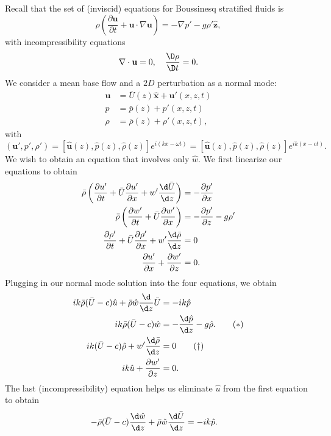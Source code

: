 \documentclass[a4paper]{article}
\begin{document}
Recall that the set of (inviscid) equations for Boussinesq stratified fluids is
\[
  \rho \left(\frac{\partial \mathbf{u}}{\partial t} + \mathbf{u} \cdot \nabla \mathbf{u}\right) = - \nabla p' - g \rho' \hat{\mathbf{z}},
\]
with incompressibility equations
\[
  \nabla \cdot \mathbf{u} = 0,\quad \frac{\D \rho}{\D t} = 0.
\]
We consider a mean base flow and a $2D$ perturbation as a normal mode:
\begin{align*}
  \mathbf{u} &= \bar{U}(z) \hat{\mathbf{x}} + \mathbf{u}'(x, z, t)\\
  p &= \bar{p}(z) + p'(x, z, t)\\
  \rho &= \bar{\rho}(z) + \rho'(x, z, t),
\end{align*}
with
\[
  (\mathbf{u}', p', \rho') = [\hat{\mathbf{u}}(z), \hat{p}(z), \hat{\rho}(z)] e^{i(kx - \omega t)} = [\hat{\mathbf{u}}(z), \hat{p}(z), \hat{\rho}(z)] e^{ik(x - ct)}.
\]
We wish to obtain an equation that involves only $\hat{w}$. We first linearize our equations to obtain
\begin{align*}
  \bar{\rho} \left(\frac{\partial u'}{\partial t} + \bar{U} \frac{\partial u'}{\partial x} + w' \frac{\d \bar{U}}{\d z}\right) &= - \frac{\partial p'}{\partial x}\\
  \bar{\rho} \left(\frac{\partial w'}{\partial t} + \bar{U} \frac{\partial w'}{\partial x} \right) &= - \frac{\partial p'}{\partial z} - g \rho'\\
  \frac{\partial \rho'}{\partial t} + \bar{U} \frac{\partial \rho'}{\partial x} + w' \frac{\d \bar{\rho}}{\d z} &= 0\\
  \frac{\partial u'}{\partial x} + \frac{\partial w'}{\partial z} &= 0.
\end{align*}
Plugging in our normal mode solution into the four equations, we obtain
\begin{align*}
  ik \bar{\rho} (\bar{U} - c) \hat{u} + \bar{\rho} \hat{w} \frac{\d}{\d z} \bar{U} &= - ik\hat{p}\\
  ik \bar{\rho} (\bar{U} - c) \hat{w} &= - \frac{\d \hat{p}}{\d z} - g \hat{\rho}.\tag{$*$}\\
  ik(\bar{U} - c) \hat{\rho} + w' \frac{\d \bar{\rho}}{\d z} &= 0 \tag{$\dagger$}\\
  ik \hat{u} + \frac{\partial w'}{\partial z} &= 0.
\end{align*}
The last (incompressibility) equation helps us eliminate $\hat{u}$ from the first equation to obtain
\begin{align*}
  - \bar{\rho} (\bar{U} - c) \frac{\d \hat{w}}{\d z} + \bar{\rho} \hat{w} \frac{\d \bar{U}}{\d z} &= -ik \hat{p}.
\end{align*}
\end{document}
